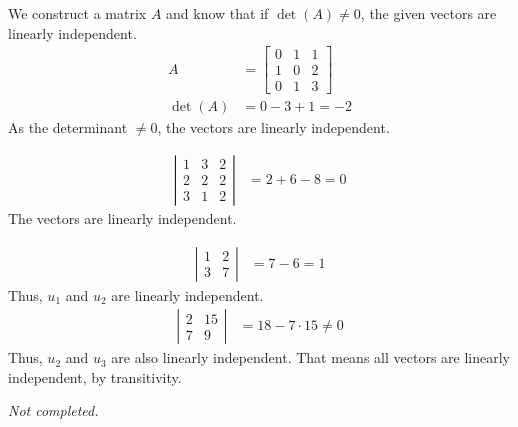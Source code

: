 \documentclass[a4paper,norsk,12pt]{article}
\begin{document}
We construct a matrix $A$ and know that if $\det{(A)} \ne 0$, the given vectors
are linearly independent.
\begin{align*}
  A &=
  \left[
    \begin{array}{ccc}
      0 & 1 & 1 \\
      1 & 0 & 2 \\
      0 & 1 & 3
    \end{array}
  \right] \\
  \det{(A)} &= 0 -3 + 1 = -2
\end{align*}
As the determinant $\ne 0$, the vectors are linearly independent.

\begin{align*}
  \left|
    \begin{array}{ccc}
      1 & 3 & 2 \\
      2 & 2 & 2 \\
      3 & 1 & 2
    \end{array}
  \right|
  &= 2+6-8 = 0
\end{align*}
The vectors are linearly independent.

\begin{align*}
  \left|
    \begin{array}{ccc}
      1 & 2 \\
      3 & 7
    \end{array}
  \right|
  &= 7-6 = 1
\end{align*}
Thus, $u_1$ and $u_2$ are linearly independent.
\begin{align*}
  \left|
    \begin{array}{ccc}
      2 & 15 \\
      7 & 9
    \end{array}
  \right|
  &= 18-7\cdot15 \ne 0
\end{align*}
Thus, $u_2$ and $u_3$ are also linearly independent. That means all vectors are
linearly independent, by transitivity.

\textit{Not completed.}
\end{document}
